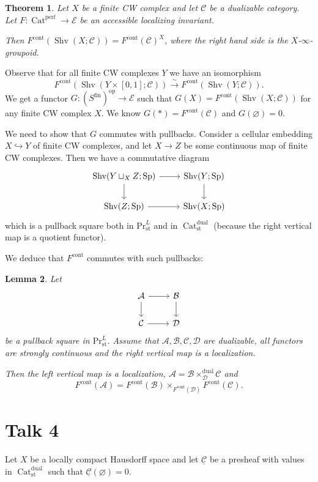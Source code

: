 \documentclass[draft]{amsart}
\newcommand{\ul}[1]{\underline{#1}}
\newcommand{\cat}[1]{\mathcal{#1}}
\renewcommand{\emptyset}{\varnothing}
\newcommand{\op}{\mathrm{op}}
\newcommand{\isoto}{\mathbin{\xrightarrow{\sim}}}
\newcommand{\injto}{\mathbin{\hookrightarrow}}
\renewcommand{\Pr}{\mathrm{Pr}}
\DeclareMathOperator{\Shv}{Shv}
\DeclareMathOperator{\Cat}{Cat}
\DeclareMathOperator{\Sp}{Sp}
\newtheorem{thm}{Theorem}[section]
\newtheorem{lem}[thm]{Lemma}
\theoremstyle{definition}
\begin{document}
\begin{thm}
Let $X$ be a finite CW complex and let $\cat C$ be a dualizable category. Let $F\colon \Cat^{\mathrm{perf}} \to \cat E$ be an accessible localizing invariant.

Then $F^{\mathrm{cont}}(\Shv(X;\cat C)) = F^{\mathrm{cont}}(\cat C)^X$, where the right hand side is the $X$-$\infty$-groupoid.
\end{thm}

Observe that for all finite CW complexes $Y$ we have an isomorphism
\[
F^{\mathrm{cont}}(\Shv(Y\times [0,1]; \cat C)) \isoto F^{\mathrm{cont}}(\Shv(Y; \cat C)).
\]
We get a functor $G\colon (S^{\mathrm{fin}})^\op \to \cat E$ such that $G(X) = F^{\mathrm{cont}}(\Shv(X;\cat C))$ for any finite CW complex $X$. We know $G(*) = F^{\mathrm{cont}}(\cat C)$ and $G(\emptyset) = 0$.

We need to show that $G$ commutes with pullbacks. Consider a cellular embedding $X\injto Y$ of finite CW complexes, and let $X\to Z$ be some continuous map of finite CW complexes. Then we have a commutative diagram
\[
\begin{tikzcd}
\Shv(Y\sqcup_XZ; \Sp) \ar[r]\ar[d] & \Shv(Y;\Sp) \ar[d] \\
\Shv(Z; \Sp) \ar[r] & \Shv(X;\Sp)
\end{tikzcd}
\]
which is a pullback square both in $\Pr^L_{\mathrm{st}}$ and in $\Cat^{\mathrm{dual}}_{\mathrm{st}}$ (because the right vertical map is a quotient functor).

We deduce that $F^{\mathrm{cont}}$ commutes with such pullbacks:

\begin{lem}
Let
\[
\begin{tikzcd}
\cat A \ar[d] \ar[r] & \cat B \ar[d] \\
\cat C \ar[r] & \cat D
\end{tikzcd}
\]
be a pullback square in $\Pr^L_{\mathrm{st}}$. Assume that $\cat A, \cat B, \cat C, \cat D$ are dualizable, all functors are strongly continuous and the right vertical map is a localization. 

Then the left vertical map is a localization, $\cat A = \cat B\times_{\cat D}^{\mathrm{dual}} \cat C$ and
\[
F^{\mathrm{cont}}(\cat A) = F^{\mathrm{cont}}(\cat B)\times_{F^{\mathrm{cont}}(\cat D)} F^{\mathrm{cont}}(\cat C).
\]
\end{lem}

\section{Talk 4} 
Let $X$ be a locally compact Hausdorff space and let $\ul{\cat C}$ be a presheaf with values in $\Cat^{\mathrm{dual}}_{\mathrm{st}}$ such that $\ul{\cat C}(\emptyset) = 0$.
\end{document}
